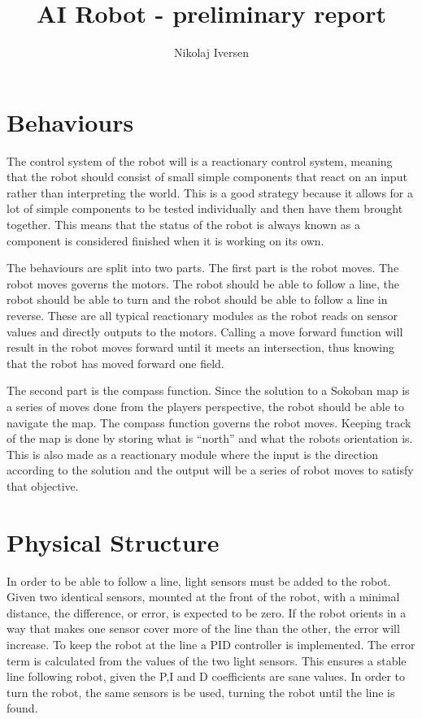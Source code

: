 \documentclass[a4paper,10pt]{article}
\title{AI Robot - preliminary report}
\author{Nikolaj Iversen}
\begin{document}
\maketitle

\section{Behaviours}
The control system of the robot will is a reactionary control system, meaning that the robot should consist of small  simple components that react on an input rather than interpreting the world.
This is a good strategy because it allows for a lot of simple components to be tested individually and then have them brought together.
This means that the status of the robot is always known as a component is considered finished when it is working on its own.

The behaviours are split into two parts.
The first part is the robot moves. 
The robot moves governs the motors. 
The robot should be able to follow a line, the robot should be able to turn and the robot should be able to follow a line in reverse.
These are all typical reactionary modules as the robot reads on sensor values and directly outputs to the motors.
Calling a move forward function will result in the robot moves forward until it meets an intersection, thus knowing that the robot has moved forward one field.

The second part is the compass function.
Since the solution to a Sokoban map is a series of moves done from the players perspective, the robot should be able to navigate the map.
The compass function governs the robot moves.
Keeping track of the map is done by storing what is ``north'' and what the robots orientation is.
This is also made as a reactionary module where the input is the direction according to the solution and the output will be a series of robot moves to satisfy that objective.

\section{Physical Structure}
In order to be able to follow a line, light sensors must be added to the robot. 
Given two identical sensors, mounted at the front of the robot, with a minimal distance, the difference, or error, is expected to be zero.
If the robot orients in a way that makes one sensor cover more of the line than the other, the error will increase.
To keep the robot at the line a PID controller is implemented.
The error term is calculated from the values of the two light sensors.
This ensures a stable line following robot, given the P,I and D coefficients are sane values.
In order to turn the robot, the same sensors is be used, turning the robot until the line is found.
\end{document}
